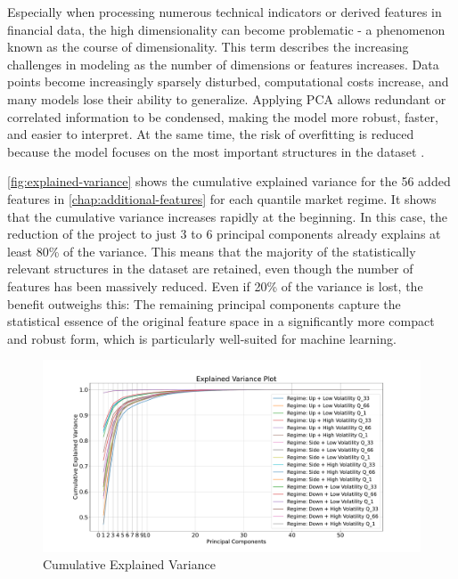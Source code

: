 Especially when processing numerous technical indicators or derived features in financial data, the high dimensionality can become problematic - a phenomenon known as the course of dimensionality.
This term describes the increasing challenges in modeling as the number of dimensions or features increases.
Data points become increasingly sparsely disturbed, computational costs increase, and many models lose their ability to generalize.
Applying PCA allows redundant or correlated information to be condensed, making the model more robust, faster, and easier to interpret.
At the same time, the risk of overfitting is reduced because the model focuses on the most important structures in the dataset \cite{wikipedia-curse-od-dimensionality}.

\autoref{fig:explained-variance} shows the cumulative explained variance for the 56 added features in \autoref{chap:additional-features} for each quantile market regime.
It shows that the cumulative variance increases rapidly at the beginning.
In this case, the reduction of the project to just 3 to 6 principal components already explains at least 80\% of the variance.
This means that the majority of the statistically relevant structures in the dataset are retained, even though the number of features has been massively reduced.
Even if 20\% of the variance is lost, the benefit outweighs this: The remaining principal components capture the statistical essence of the original feature space in a significantly more compact and robust form, which is particularly well-suited for machine learning.


\begin{figure}[H]
    \centering
    \includegraphics[width=\textwidth]{images/eda/explained_variance}
    \caption{Cumulative Explained Variance}
    \label{fig:explained-variance}
\end{figure}
